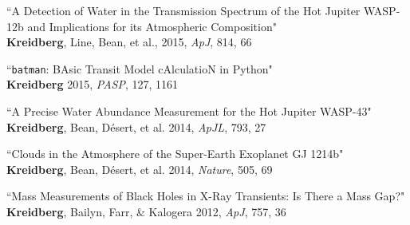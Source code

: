 \documentclass[12pt,letterpaper]{article}
\begin{document}
\begin{compactenum}
\item ``A Detection of Water in the Transmission Spectrum of the Hot Jupiter WASP-12b and Implications for its Atmospheric Composition"\\
\textbf{Kreidberg}, Line,  Bean, et al., 2015, \textit{ApJ}, 814, 66

\item ``\texttt{batman}: BAsic Transit Model cAlculatioN in Python"\\
\textbf{Kreidberg} 2015, \textit{PASP}, 127, 1161 

\item ``A Precise Water Abundance Measurement for the Hot Jupiter WASP-43"\\
\textbf{Kreidberg}, Bean, D\'esert, et al. 2014, \textit{ApJL}, 793, 27

\item ``Clouds in the Atmosphere of the Super-Earth Exoplanet GJ 1214b"\\
\textbf{Kreidberg}, Bean, D\'esert, et al. 2014, \textit{Nature}, 505, 69

\item ``Mass Measurements of Black Holes in X-Ray Transients:  Is There a Mass Gap?"\\
\textbf{Kreidberg}, Bailyn, Farr, \& Kalogera 2012, \textit{ApJ}, 757, 36
\end{compactenum}
\end{document}
